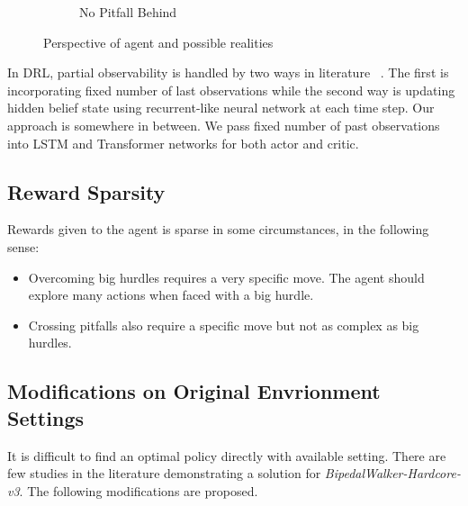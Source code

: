 \begin{figure}
\begin{subfigure}{.32\textwidth}
		\caption{No Pitfall Behind}
		\label{fig:no_pitfall_behind}
	\end{subfigure}
	\caption{Perspective of agent and possible realities}
	\label{fig:partial_obs_pitfall}
\end{figure}

In DRL, partial observability is handled by two ways in literature~ \cite{dulac-arnold_challenges_2019}. 
The first is incorporating fixed number of last observations while the second way is updating hidden belief state using recurrent-like neural network at each time step. 
Our approach is somewhere in between. We pass fixed number of past observations into LSTM and Transformer networks for both actor and critic. 

\subsection{Reward Sparsity}

Rewards given to the agent is sparse in some circumstances, in the following sense:
\begin{itemize}
	\item Overcoming big hurdles requires a very specific move. 
	The agent should explore many actions when faced with a big hurdle.
	\item Crossing pitfalls also require a specific move but not as complex as big hurdles.
\end{itemize}

\subsection{Modifications on Original Envrionment Settings}

It is difficult to find an optimal policy directly with available setting. 
There are few studies in the literature demonstrating a solution for \textit{BipedalWalker-Hardcore-v3}. 
The following modifications are proposed.

